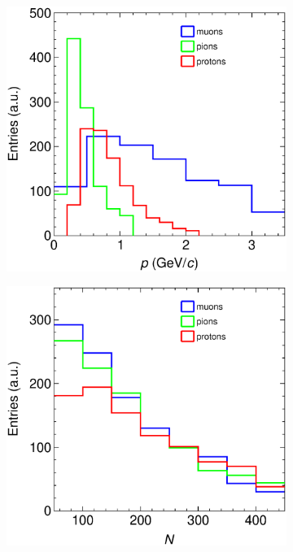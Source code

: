 \begin{figure}[t]
\begin{subfigure}[b]{0.32\textwidth}
         \caption{}
    \label{fig:ALICEStRecoGAr_lArmMCparticles}
     \end{subfigure}
     \begin{subfigure}[b]{0.32\textwidth}
         \centering
         \includegraphics[width=\textwidth]{figures/ch6-TKI/Properties/ALICEStRecoGAr_pparticles.eps}
         \caption{}
         \label{fig:ALICEStRecoGAr_pparticles}
     \end{subfigure}
     \begin{subfigure}[b]{0.32\textwidth}
         \centering
         \includegraphics[width=\textwidth]{figures/ch6-TKI/Properties/ALICEStRecoGAr_Nparticles.eps}

\end{subfigure}
\end{figure}
